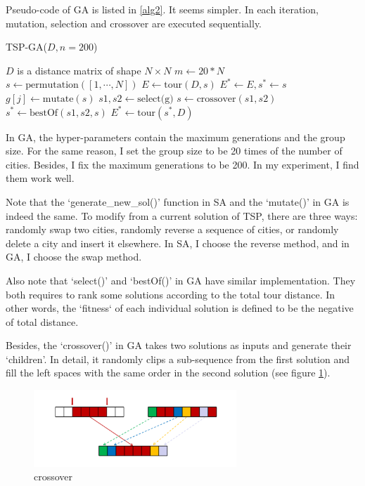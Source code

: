 \documentclass[a4paper,12pt]{article}
\begin{document}
	Pseudo-code of GA is listed in \ref{alg2}. It seems simpler. In each iteration, mutation, selection and crossover are executed sequentially.
	\newpage

	\begin{algorithm}[!htbp]
	\caption{TSP-GA($D, n=200$)}
	\label{alg2}
	\begin{algorithmic}
		\REQUIRE $D$ is a distance matrix of shape $N\times N$
		\STATE $m \gets 20 * N$
		\STATE $s \gets \text{permutation}([1,\cdots,N])$
		\STATE $E \gets \text{tour}(D, s)$
		\STATE $E^* \gets E, s^* \gets s$
				\STATE $g[j] \gets \text{mutate}(s)$
			\ENDFOR
			\STATE $s1, s2 \gets \text{select(g)}$
			\STATE $s \gets \text{crossover}(s1, s2)$
			\STATE $s^* \gets \text{bestOf}(s1, s2, s)$
			\STATE $E^* \gets \text{tour}(s^*, D)$
			\ENDFOR
	\end{algorithmic}
	\end{algorithm}

	In GA, the hyper-parameters contain the maximum generations and the group size. For the same reason, I set the group size to be  20 times of the number of cities. Besides, I fix the maximum generations to be 200. In my experiment, I find them work well.

	Note that the `generate\_new\_sol()' function in SA and the `mutate()' in GA is indeed the same. To modify from a current solution of TSP, there are three ways: randomly swap two cities, randomly reverse a sequence of cities, or randomly delete a city and insert it elsewhere. In SA, I choose the reverse method, and in GA, I choose the swap method.

	Also note that `select()' and `bestOf()' in GA have similar implementation. They both requires to rank some solutions according to the total tour distance. In other words, the `fitness` of each individual solution is defined to be the negative of total distance.

	Besides, the `crossover()' in GA takes two solutions as inputs and generate their `children'. In detail, it randomly clips a sub-sequence from the first solution and fill the left spaces with the same order in the second solution (see figure \ref{fig1}).

	\begin{figure}[!htbp]
	\centering
	\includegraphics[width=3in]{crossover.png}
	\caption{crossover}
	\label{fig1}
	\end{figure}
\end{document}
